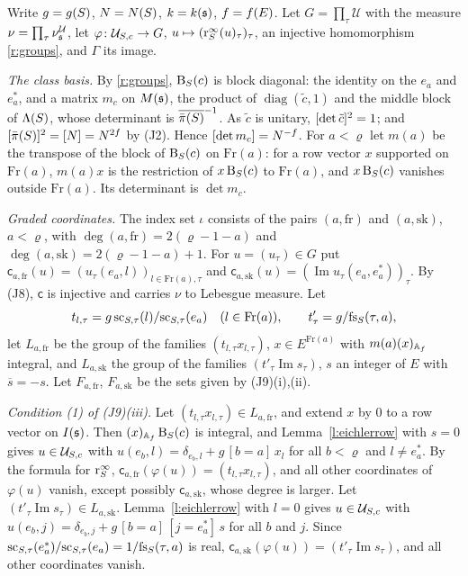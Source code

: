 \documentclass[11pt,a4paper]{article}
\makeatletter
\theoremstyle{plainx}
\theoremstyle{uprightx}
\renewenvironment{proof}[1][Proof]{\par\pushQED{\qed}\normalfont\topsep0pt\partopsep0pt
  \trivlist\item[\hskip\labelsep\itshape #1.]\ignorespaces}{\popQED\endtrivlist\@endpefalse}
\newcommand{\muU}[1]{\nu^{\mathcal{U}}_{#1}}               %
\newcommand{\cj}[1]{\overline{#1}}
\newcommand{\ImPt}{\operatorname{Im}}
\makeatother
\begin{document}
\begin{proof}[Proof of Theorem C]
Write $g=g(S)$, $N=N(S)$, $k=k(\mathfrak{s})$, $f=f(E)$. Let $G=\prod_\tau\mathcal U$ with the measure
$\nu=\prod_\tau\muU{\fs}$, let $\varphi\colon\mathcal{U}_{S,c}\to G$, $u\mapsto(\mathrm{r}^{\infty}_{S}(u)_\tau)_\tau$, an injective
homomorphism \ref{r:groups}, and $\Gamma$ its image.

\emph{The class basis.} By \ref{r:groups}, $\mathrm{B}_{S}(c)$ is block diagonal: the identity on the $e_a$ and $e^*_a$,
and a matrix $m_c$ on $M(\mathfrak{s})$, the product of $\operatorname{diag}(\tilde c,1)$ and the middle block of $\Lambda(S)$,
whose determinant is $\cj{\piS{S}}^{-1}$. As $\tilde c$ is unitary, $[\det\tilde c]^2=1$; and
$[\bar\pi(S)]^2=[N]=N^{2f}$ by (J2). Hence $[\det m_c]=N^{-f}$. For $a<\varrho$ let $m(a)$ be the transpose
of the block of $\mathrm{B}_{S}(c)$ on $\mathrm{Fr}(a)$: for a row vector $x$ supported on $\mathrm{Fr}(a)$,
$m(a)x$ is the restriction of $x\,\mathrm{B}_{S}(c)$ to $\mathrm{Fr}(a)$, and $x\,\mathrm{B}_{S}(c)$ vanishes outside
$\mathrm{Fr}(a)$. Its determinant is $\det m_c$.

\emph{Graded coordinates.} The index set $\iota$ consists of the pairs $(a,\mathrm{fr})$ and $(a,\mathrm{sk})$,
$a<\varrho$, with $\deg(a,\mathrm{fr})=2(\varrho-1-a)$ and $\deg(a,\mathrm{sk})=2(\varrho-1-a)+1$. For
$u=(u_\tau)\in G$ put $\mathsf c_{a,\mathrm{fr}}(u)=(u_\tau(e_a,l))_{l\in\mathrm{Fr}(a),\tau}$ and
$\mathsf c_{a,\mathrm{sk}}(u)=(\ImPt u_\tau(e_a,e^*_a))_\tau$. By (J8), $\mathsf c$ is injective and carries $\nu$ to
Lebesgue measure. Let
\[t_{l,\tau}=g\,\mathrm{sc}_{S,\tau}(l)/\mathrm{sc}_{S,\tau}(e_a)\quad(l\in\mathrm{Fr}(a)),\qquad t'_\tau=g/\mathrm{fs}_{S}(\tau,a),\]
let $L_{a,\mathrm{fr}}$ be the group of the families $(t_{l,\tau}x_{l,\tau})$, $x\in E^{\mathrm{Fr}(a)}$ with
$m(a)(x)_{\mathbb{A}_{f}}$ integral, and $L_{a,\mathrm{sk}}$ the group of the families $(t'_\tau\ImPt s_\tau)$, $s$ an integer of $E$
with $\cj{s}=-s$. Let $F_{a,\mathrm{fr}}$, $F_{a,\mathrm{sk}}$ be the sets given by (J9)(i),(ii).

\emph{Condition (1) of (J9)(iii).} Let $(t_{l,\tau}x_{l,\tau})\in L_{a,\mathrm{fr}}$, and extend $x$ by $0$ to a row
vector on $I(\mathfrak{s})$. Then $(x)_{\mathbb{A}_{f}}\,\mathrm{B}_{S}(c)$ is integral, and Lemma~\ref{l:eichlerrow} with $s=0$ gives
$u\in\mathcal{U}_{S,c}$ with $u(e_b,l)=\delta_{e_b,l}+g\,[b=a]\,x_l$ for all $b<\varrho$ and $l\ne e^*_a$. By the formula for
$\mathrm{r}^{\infty}_{S}$, $\mathsf c_{a,\mathrm{fr}}(\varphi(u))=(t_{l,\tau}x_{l,\tau})$, and all other coordinates of $\varphi(u)$
vanish, except possibly $\mathsf c_{a,\mathrm{sk}}$, whose degree is larger. Let $(t'_\tau\ImPt s_\tau)\in L_{a,\mathrm{sk}}$.
Lemma~\ref{l:eichlerrow} with $l=0$ gives $u\in\mathcal{U}_{S,c}$ with $u(e_b,j)=\delta_{e_b,j}+g\,[b=a]\,[j=e^*_a]\,s$ for
all $b$ and $j$. Since $\mathrm{sc}_{S,\tau}(e^*_a)/\mathrm{sc}_{S,\tau}(e_a)=1/\mathrm{fs}_{S}(\tau,a)$ is real,
$\mathsf c_{a,\mathrm{sk}}(\varphi(u))=(t'_\tau\ImPt s_\tau)$, and all other coordinates vanish.


\end{proof}
\end{document}
